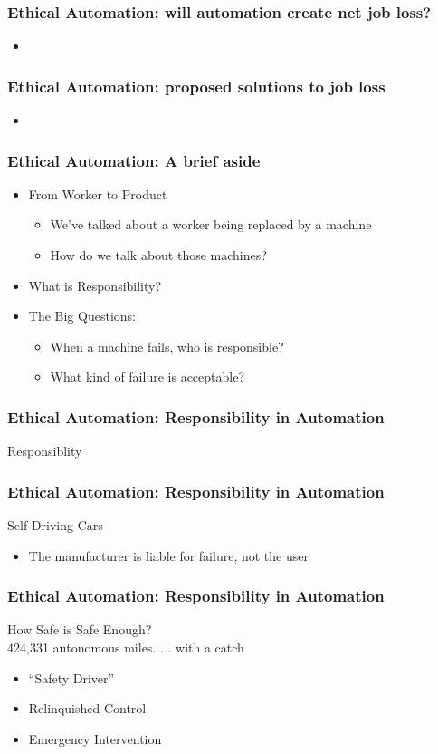 \begin{frame}
  \frametitle{ Ethical Automation: will automation create net job loss?}
  \begin{itemize} 
  \item
  \end{itemize}
\end{frame}


\begin{frame}
  \frametitle{ Ethical Automation: proposed solutions to job loss}
  \begin{itemize}
  \item
  \end{itemize}
\end{frame}

\begin{frame}
  \frametitle{ Ethical Automation: A brief aside}
  \begin{itemize}
  \item From Worker to Product
    \begin{itemize}
    \item We've talked about a worker being replaced by a machine
    \item How do we talk about those machines?
    \end{itemize}
  \item What is Responsibility?
  \item The Big Questions:
    \begin{itemize}
    \item When a machine fails, who is responsible?
    \item What kind of failure is acceptable?
    \end{itemize}
  \end{itemize}
\end{frame}


\begin{frame}
  \frametitle{ Ethical Automation: Responsibility in Automation}
  \Large{Responsiblity}
\end{frame}


\begin{frame}
  \frametitle{ Ethical Automation: Responsibility in Automation}
  {\Large Self-Driving Cars}
  \begin{itemize}
  \item The manufacturer is liable for failure, not the user
  \end{itemize}
\end{frame}


\begin{frame}
  \frametitle{ Ethical Automation: Responsibility in Automation}
  {\Large How Safe is Safe Enough?}\\
  424,331 autonomous miles. . . with a catch
  \begin{itemize}
  \item ``Safety Driver''
  \item Relinquished Control
  \item Emergency Intervention
  \end{itemize}
\end{frame}


